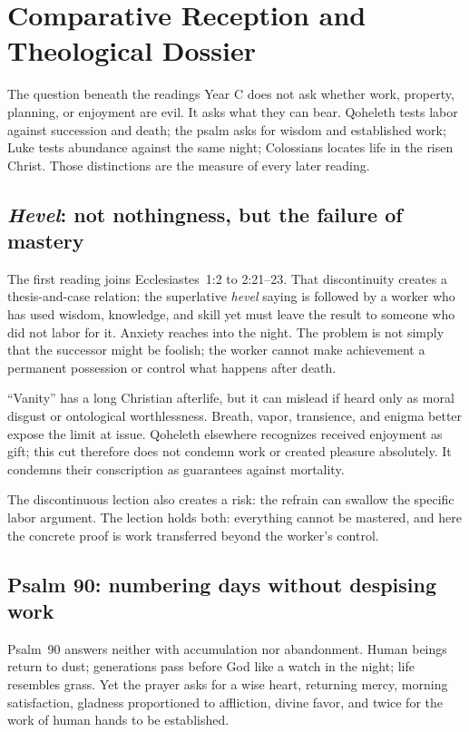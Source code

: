\section*{Comparative Reception and Theological Dossier}

\begin{studybox}{The question beneath the readings}
Year C does not ask whether work, property, planning, or enjoyment are evil.
It asks what they can bear. Qoheleth tests labor against succession and death;
the psalm asks for wisdom and established work; Luke tests abundance against
the same night; Colossians locates life in the risen Christ. Those distinctions are the measure of every later reading.
\end{studybox}

\subsection*{\emph{Hevel}: not nothingness, but the failure of mastery}

The first reading joins Ecclesiastes~1:2 to 2:21--23. That discontinuity creates
a thesis-and-case relation: the superlative \emph{hevel} saying is followed by
a worker who has used wisdom, knowledge, and skill yet must leave the result
to someone who did not labor for it. Anxiety reaches into the night. The
problem is not simply that the successor might be foolish; the worker cannot
make achievement a permanent possession or control what happens after death.

“Vanity” has a long Christian afterlife, but it can mislead if heard only as
moral disgust or ontological worthlessness. Breath, vapor, transience, and
enigma better expose the limit at issue. Qoheleth elsewhere recognizes
received enjoyment as gift; this cut therefore does not condemn work or created pleasure absolutely. It condemns their conscription as
guarantees against mortality.

The discontinuous lection also creates a risk: the refrain can swallow the
specific labor argument. The lection holds both: everything cannot be mastered, and here the concrete proof is work transferred beyond the
worker's control.

\subsection*{Psalm 90: numbering days without despising work}

Psalm~90 answers neither with accumulation nor abandonment. Human beings return
to dust; generations pass before God like a watch in the night; life resembles
grass. Yet the prayer asks for a wise heart, returning mercy, morning
satisfaction, gladness proportioned to affliction, divine favor, and twice for
the work of human hands to be established.

